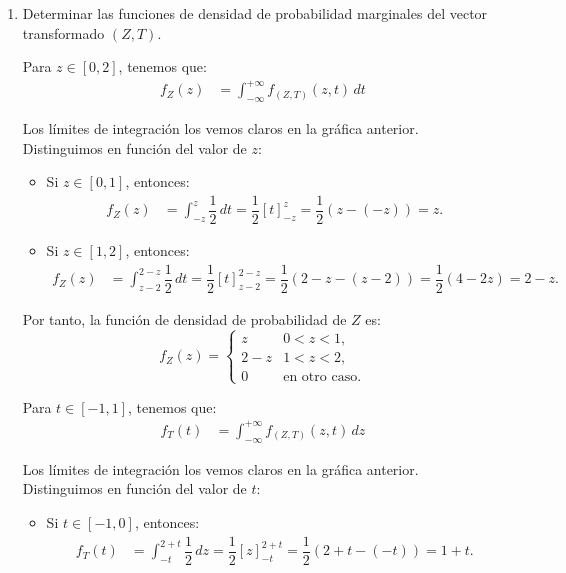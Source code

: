 \documentclass[12pt]{article}
\begin{document}
\begin{ejercicio}
\begin{enumerate}
            \item Determinar las funciones de densidad de probabilidad marginales del vector transformado $(Z,T)$.
            
            Para $z\in [0,2]$, tenemos que:
            \begin{align*}
                f_Z(z)&=\int_{-\infty}^{+\infty} f_{(Z,T)}(z, t) \, dt
            \end{align*}
    
            Los límites de integración los vemos claros en la gráfica anterior. Distinguimos en función del valor de $z$:
            \begin{itemize}
                \item Si $z\in [0,1]$, entonces:
                \begin{align*}
                    f_Z(z)&=\int_{-z}^{z} \dfrac{1}{2} \, dt = \dfrac{1}{2}\left[t\right]_{-z}^z = \dfrac{1}{2}(z-(-z)) = z.
                \end{align*}
    
                \item Si $z\in [1,2]$, entonces:
                \begin{align*}
                    f_Z(z)&=\int_{z-2}^{2-z} \dfrac{1}{2} \, dt = \dfrac{1}{2}\left[t\right]_{z-2}^{2-z} = \dfrac{1}{2}(2-z-(z-2)) = \dfrac{1}{2}(4-2z) = 2-z.
                \end{align*}
            \end{itemize}
    
            Por tanto, la función de densidad de probabilidad de $Z$ es:
            \begin{equation*}
                f_Z(z) = \begin{cases}
                    z & 0<z<1, \\
                    2-z & 1<z<2, \\
                    0 & \text{en otro caso}.
                \end{cases}
            \end{equation*}
    
            Para $t\in [-1,1]$, tenemos que:
            \begin{align*}
                f_T(t)&=\int_{-\infty}^{+\infty} f_{(Z,T)}(z, t) \, dz
            \end{align*}
    
            Los límites de integración los vemos claros en la gráfica anterior. Distinguimos en función del valor de $t$:
            \begin{itemize}
                \item Si $t\in [-1,0]$, entonces:
                \begin{align*}
                    f_T(t)&=\int_{-t}^{2+t} \dfrac{1}{2} \, dz = \dfrac{1}{2}\left[z\right]_{-t}^{2+t} = \dfrac{1}{2}(2+t-(-t)) = 1+t.
                \end{align*}
    

\end{itemize}
\end{enumerate}
\end{ejercicio}
\end{document}
